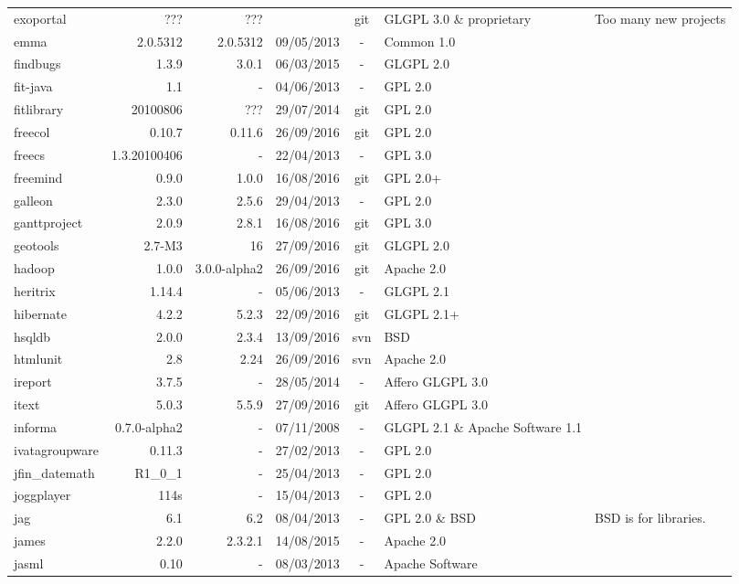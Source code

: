 \documentclass{sig-alternate-05-2015}
\begin{document}
\begin{table}
\begin{tabular}{l|r|r|c|c|p{3cm}|p{3cm}}
			exoportal & ??? & ??? &  & git & GLGPL 3.0 \& proprietary & Too many new projects \\
			emma & 2.0.5312 & 2.0.5312 & 09/05/2013  & - & Common   1.0 \\
			findbugs & 1.3.9 & 3.0.1 & 06/03/2015 & - & GLGPL 2.0 \\
			fit-java & 1.1 & - & 04/06/2013 & - & GPL 2.0 \\
			fitlibrary & 20100806 & ??? & 29/07/2014 & git & GPL 2.0 \\
			freecol & 0.10.7 & 0.11.6 & 26/09/2016 & git & GPL 2.0 &  \\
			freecs & 1.3.20100406 & - & 22/04/2013 & - & GPL 3.0 &   \\
			freemind & 0.9.0 & 1.0.0 & 16/08/2016 & git & GPL 2.0+ &  \\
			galleon & 2.3.0 & 2.5.6 & 29/04/2013 & - & GPL 2.0 \\
			ganttproject & 2.0.9 & 2.8.1 & 16/08/2016 & git & GPL 3.0 &  \\
			geotools & 2.7-M3 & 16 & 27/09/2016 & git & GLGPL 2.0 \\
			hadoop & 1.0.0 & 3.0.0-alpha2 & 26/09/2016 & git & Apache 2.0 \\
			heritrix & 1.14.4 & - & 05/06/2013 & - & GLGPL 2.1 \\
			hibernate & 4.2.2 & 5.2.3 & 22/09/2016 & git & GLGPL 2.1+ \\
			hsqldb & 2.0.0 & 2.3.4 & 13/09/2016 & svn & BSD  \\
			htmlunit & 2.8 & 2.24 & 26/09/2016 & svn & Apache 2.0 \\
			ireport & 3.7.5 & - & 28/05/2014 & - & Affero GLGPL 3.0 \\
			itext & 5.0.3 & 5.5.9 & 27/09/2016 & git & Affero GLGPL 3.0 \\
			informa & 0.7.0-alpha2 & - & 07/11/2008 & - & GLGPL 2.1 \& Apache Software 1.1 \\
			ivatagroupware & 0.11.3 & - & 27/02/2013 & - & GPL 2.0 \\
			jfin\_datemath & R1\_0\_1 & - & 25/04/2013 & - & GPL 2.0 \\
			joggplayer & 114s & - &  15/04/2013 & - & GPL 2.0 \\
			jag & 6.1 & 6.2 & 08/04/2013  & - & GPL 2.0 \& BSD  & BSD  is for libraries. \\
			james & 2.2.0 & 2.3.2.1 & 14/08/2015 & - & Apache 2.0 \\
			jasml & 0.10 & - & 08/03/2013 & - & Apache Software  \\

\end{tabular}
\end{table}
\end{document}
